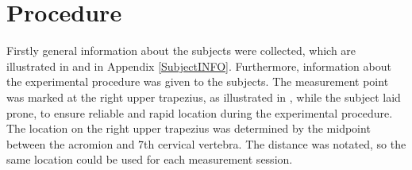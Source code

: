 



\section{Procedure}
Firstly general information about the subjects were collected, which are illustrated in  and  in Appendix \ref{SubjectINFO}. Furthermore, information about the experimental procedure was given to the subjects. The measurement point was marked at the right upper trapezius, as illustrated in , while the subject laid prone, to ensure reliable and rapid location during the experimental procedure. 
The location on the right upper trapezius was determined by the midpoint between the acromion and 7th cervical vertebra. The distance was notated, so the same location could be used for each measurement session. 

